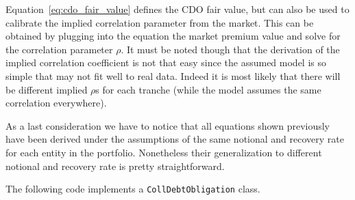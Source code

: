 Equation~\ref{eq:cdo_fair_value} defines the CDO fair value, but can also be used to calibrate the implied correlation parameter from the market. This can be obtained by plugging into the equation the market premium value and solve for the correlation parameter $\rho$. It must be noted though that the derivation of the implied correlation coefficient is not that easy since the assumed model is so simple that may not fit well to real data. Indeed it is most likely that there will be different implied $\rho$s for each tranche (while the model assumes the same correlation everywhere).

As a last consideration we have to notice that all equations shown previously have been derived under the assumptions of the same notional and recovery rate for each entity in the portfolio. Nonetheless their generalization to different notional and recovery rate is pretty straightforward.
 
%

The following code implements a \texttt{CollDebtObligation} class.

